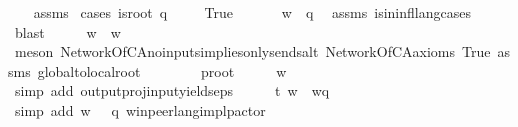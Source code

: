 \begin{isabellebody}
%
\isadelimproof
\ \ %
\endisadelimproof
%
\isatagproof
{}\isamarkupfalse%
\ assms\isanewline
{}\isamarkupfalse%
\ {\isacharparenleft}{\kern0pt}cases\ {\isachardoublequoteopen}is{\isacharunderscore}{\kern0pt}root\ q{\isachardoublequoteclose}{\isacharparenright}{\kern0pt}\ \isanewline
\ \ \isamarkupfalse%
\ True\ %
\isanewline
\ \ \isamarkupfalse%
\ \isamarkupfalse%
\ {\isachardoublequoteopen}w\ {\isasymin}\ {\isasymL}{\isacharparenleft}{\kern0pt}q{\isacharparenright}{\kern0pt}{\isachardoublequoteclose}\ \isamarkupfalse%
\ assms{\isacharparenleft}{\kern0pt}{}{\isacharparenright}{\kern0pt}\ is{\isacharunderscore}{\kern0pt}in{\isacharunderscore}{\kern0pt}infl{\isacharunderscore}{\kern0pt}lang{\isachardot}{\kern0pt}cases\ \isamarkupfalse%
\ blast\isanewline
\ \ \isamarkupfalse%
\ \isamarkupfalse%
\ {\isachardoublequoteopen}w\ {\isacharequal}{\kern0pt}\ w{\isasymdown}\isactrlsub {\isacharbang}{\kern0pt}{\isachardoublequoteclose}\ \ \isamarkupfalse%
\ {\isacharparenleft}{\kern0pt}meson\ NetworkOfCA{\isachardot}{\kern0pt}no{\isacharunderscore}{\kern0pt}inputs{\isacharunderscore}{\kern0pt}implies{\isacharunderscore}{\kern0pt}only{\isacharunderscore}{\kern0pt}sends{\isacharunderscore}{\kern0pt}alt\ NetworkOfCA{\isacharunderscore}{\kern0pt}axioms\ True\ assms{\isacharparenleft}{\kern0pt}{}{\isacharparenright}{\kern0pt}\ global{\isacharunderscore}{\kern0pt}to{\isacharunderscore}{\kern0pt}local{\isacharunderscore}{\kern0pt}root\isanewline
\ \ \ \ \ \ \ \ p{\isacharunderscore}{\kern0pt}root{\isacharparenright}{\kern0pt}\isanewline
\ \ \isamarkupfalse%
\ \isamarkupfalse%
\ {\isachardoublequoteopen}w{\isasymdown}\isactrlsub {\isacharquery}{\kern0pt}\ {\isacharequal}{\kern0pt}\ {\isasymepsilon}{\isachardoublequoteclose}\ \ \isamarkupfalse%
\ {\isacharparenleft}{\kern0pt}simp\ add{\isacharcolon}{\kern0pt}\ output{\isacharunderscore}{\kern0pt}proj{\isacharunderscore}{\kern0pt}input{\isacharunderscore}{\kern0pt}yields{\isacharunderscore}{\kern0pt}eps{\isacharparenright}{\kern0pt}\isanewline
\ \ \isamarkupfalse%
\ \isamarkupfalse%
\ t{}{\isacharcolon}{\kern0pt}\ {\isachardoublequoteopen}w\ {\isacharequal}{\kern0pt}\ w{\isasymdown}\isactrlsub q{\isachardoublequoteclose}\ \isamarkupfalse%
\ {\isacharparenleft}{\kern0pt}simp\ add{\isacharcolon}{\kern0pt}\ {\isacartoucheopen}w\ {\isasymin}\ {\isasymL}\ q{\isacartoucheclose}\ w{\isacharunderscore}{\kern0pt}in{\isacharunderscore}{\kern0pt}peer{\isacharunderscore}{\kern0pt}lang{\isacharunderscore}{\kern0pt}impl{\isacharunderscore}{\kern0pt}p{\isacharunderscore}{\kern0pt}actor{\isacharparenright}{\kern0pt}\isanewline

\end{isabellebody}
